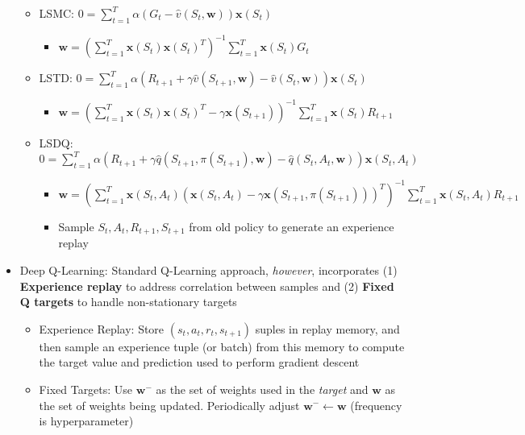 \documentclass{article}
\providecommand{\tightlist}{%
  \setlength{\itemsep}{\GlobalItemSep}\setlength{\parskip}{\GlobalListParSkip}}
\newlength{\GlobalItemSep}
\newlength{\GlobalListParSkip}
\providecommand{\bold}[1]{\mathbf{#1}}
\begin{document}
\begin{multicols}{2}
\begin{itemize}
  \begin{itemize}
  \tightlist
  \item
    LSMC:
    \(0 = \sum_{t=1}^T \alpha(G_t - \hat{v}(S_t, \bold{w}))\bold{x}(S_t)\)

    \begin{itemize}
    \tightlist
    \item
      \(\bold{w} = (\sum_{t=1}^T \bold{x}(S_t) \bold{x}(S_t)^T)^{-1} \sum_{t=1}^T \bold{x}(S_t)G_t\)
    \end{itemize}
  \item
    LSTD:
    \(0 = \sum_{t=1}^T \alpha(R_{t+1} + \gamma \hat{v}(S_{t+1}, \bold{w}) - \hat{v}(S_t, \bold{w}))\bold{x}(S_t)\)

    \begin{itemize}
    \tightlist
    \item
      \(\bold{w} = (\sum_{t=1}^T \bold{x}(S_t) \bold{x}(S_t)^T - \gamma \bold{x}(S_{t+1}))^{-1} \sum_{t=1}^T \bold{x}(S_t)R_{t+1}\)
    \end{itemize}
  \item
    LSDQ:
    \(0 = \sum_{t=1}^T \alpha(R_{t+1} + \gamma \hat{q} (S_{t+1}, \pi (S_{t+1}), \bold{w}) - \hat{q} (S_t, A_t, \bold{w}))\bold{x} (S_t, A_t)\)

    \begin{itemize}
    \tightlist
    \item
      \(\bold{w} = (\sum_{t=1}^T \bold{x} (S_t, A_t)(\bold{x} (S_t, A_t) - \gamma \bold{x} (S_{t+1}, \pi (S_{t+1})))^T)^{-1} \sum_{t=1}^T \bold{x} (S_t, A_t) R_{t+1}\)
    \item
      Sample \(S_t, A_t, R_{t+1}, S_{t+1}\) from old policy to generate
      an experience replay
    \end{itemize}
  \end{itemize}
\item
  Deep Q-Learning: Standard Q-Learning approach, \emph{however},
  incorporates (1) \textbf{Experience replay} to address correlation
  between samples and (2) \textbf{Fixed Q targets} to handle
  non-stationary targets

  \begin{itemize}
  \tightlist
  \item
    Experience Replay: Store \((s_t, a_t, r_t, s_{t+1})\) suples in
    replay memory, and then sample an experience tuple (or batch) from
    this memory to compute the target value and prediction used to
    perform gradient descent
  \item
    Fixed Targets: Use \(\bold{w^-}\) as the set of weights used in the
    \emph{target} and \(\bold{w}\) as the set of weights being updated.
    Periodically adjust \(\bold{w^-} \leftarrow \bold{w}\) (frequency is
    hyperparameter)


\end{itemize}
\end{itemize}
\end{multicols}
\end{document}
